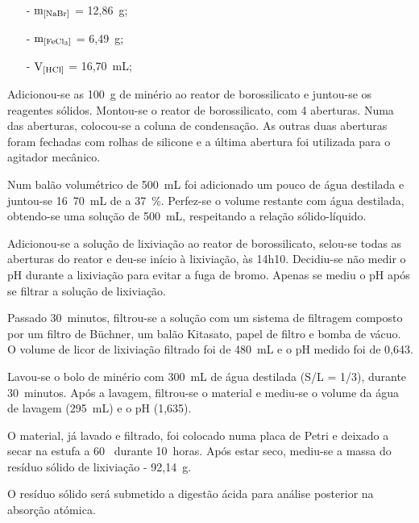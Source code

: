 \begin{itemize}
	\item[-] $\mathrm{m}_{\left[\bromo{}\right]}$ = 12,86~g;
	\item[-] $\mathrm{m}_{\left[\cloretofe{}\right]}$ = 6,49~g;
	\item[-] $\mathrm{V}_{\left[\acl{}\right]}$ = 16,70~mL;
\end{itemize}

Adicionou-se as 100~g de minério ao reator de borossilicato e juntou-se os reagentes sólidos. 
Montou-se o reator de borossilicato, com 4 aberturas. 
Numa das aberturas, colocou-se a coluna de condensação.
As outras duas aberturas foram fechadas com rolhas de silicone e a última abertura foi utilizada para o agitador mecânico.

Num balão volumétrico de 500~mL foi adicionado um pouco de água destilada e juntou-se 16~70~mL de \acl{} a 37~\%. Perfez-se o volume restante com água destilada, obtendo-se uma solução de 500~mL, respeitando a relação sólido-líquido.

Adicionou-se a solução de lixiviação ao reator de borossilicato, selou-se todas as aberturas do reator e deu-se início à lixiviação, às 14h10.
Decidiu-se não medir o pH durante a lixiviação para evitar a fuga de bromo. 
Apenas se mediu o pH após se filtrar a solução de lixiviação.


Passado 30~minutos, filtrou-se a solução com um sistema de filtragem composto por um filtro de Büchner, um balão Kitasato, papel de filtro e bomba de vácuo.
O volume de licor de lixiviação filtrado foi de 480~mL e o pH medido foi de 0,643.

Lavou-se o bolo de minério com 300~mL de água destilada (S/L = 1/3), durante 30~minutos.
Após a lavagem, filtrou-se o material e mediu-se o volume da água de lavagem (295~mL) e o pH (1,635).

O material, já lavado e filtrado, foi colocado numa placa de Petri e deixado a secar na estufa a 60~\graus{} durante 10~horas.
Após estar seco, mediu-se a massa do resíduo sólido de lixiviação - 92,14~g.

O resíduo sólido será submetido a digestão ácida para análise posterior na absorção atómica.

